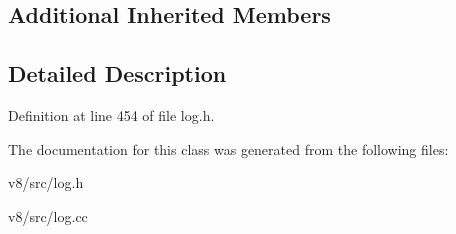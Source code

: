 \subsection*{Additional Inherited Members}


\subsection{Detailed Description}


Definition at line 454 of file log.\+h.



The documentation for this class was generated from the following files\+:\begin{DoxyCompactItemize}
\item 
v8/src/log.\+h\item 
v8/src/log.\+cc\end{DoxyCompactItemize}
